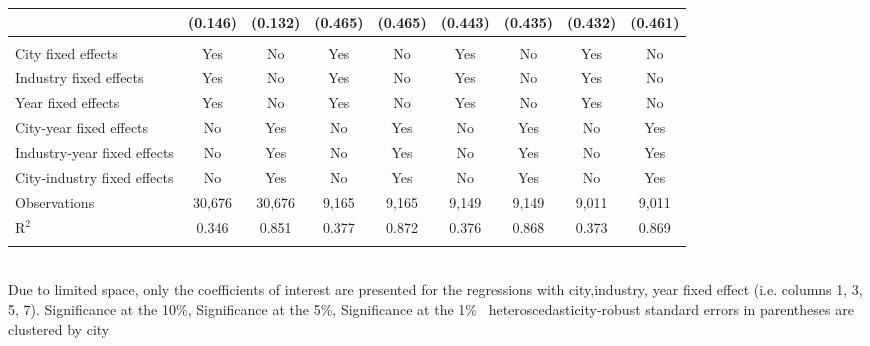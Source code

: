 \documentclass[12pt]{article}
\begin{document}
\begin{table}[!htbp]
\begin{adjustbox}{width=\textwidth, totalheight=\baselineskip,keepaspectratio}
\begin{tabular}{@{\extracolsep{5pt}}lcccccccc}
  & (0.146) & (0.132) & (0.465) & (0.465) & (0.443) & (0.435) & (0.432) & (0.461) \\ 
 \hline \\[-1.8ex] 
City fixed effects & Yes & No & Yes & No & Yes & No & Yes & No \\ 
Industry fixed effects & Yes & No & Yes & No & Yes & No & Yes & No \\ 
Year fixed effects & Yes & No & Yes & No & Yes & No & Yes & No \\ 
City-year fixed effects & No & Yes & No & Yes & No & Yes & No & Yes \\ 
Industry-year fixed effects & No & Yes & No & Yes & No & Yes & No & Yes \\ 
City-industry fixed effects & No & Yes & No & Yes & No & Yes & No & Yes \\ 
Observations & 30,676 & 30,676 & 9,165 & 9,165 & 9,149 & 9,149 & 9,011 & 9,011 \\ 
R$^{2}$ & 0.346 & 0.851 & 0.377 & 0.872 & 0.376 & 0.868 & 0.373 & 0.869 \\ 
\hline 
\hline \\[-1.8ex] 
\end{tabular}
\end{adjustbox}
\begin{tablenotes} 
 \small 
 \item \\ 
\footnotesize{
Due to limited space, only the coefficients of interest are presented 
for the regressions with city,industry, year fixed effect (i.e. columns 1, 3, 5, 7).
\sym{*} Significance at the 10\%, \sym{**} Significance at the 5\%, \sym{***} Significance at the 1\% \
heteroscedasticity-robust standard errors in parentheses are clustered by city 
}
 
\end{tablenotes}
\end{table}
\end{document}
